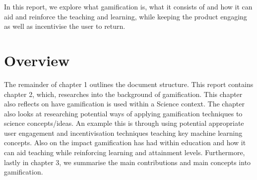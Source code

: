 		In this report, we explore what gamification is, what it consists of and how it can aid and reinforce the teaching and learning, while keeping the product engaging as well as incentivise the user to return. 
		
	\section{Overview}  
		\label{sec:intro_overview} 
		
		The remainder of chapter 1 outlines the document structure. This report contains chapter 2, which, researches into the background of gamification. This chapter also reflects on have gamification is used within a Science context. The chapter also looks at researching potential ways of applying gamification techniques to science concepts/ideas. An example this is through using potential appropriate user engagement and incentivisation techniques teaching key machine learning concepts. Also on the impact gamification has had within education and how it can aid teaching while reinforcing learning and attainment levels. Furthermore, lastly in chapter 3, we summarise the main contributions and main concepts into gamification.
	
		
		
		
			
			 
			
			
			
						
			
			
			
